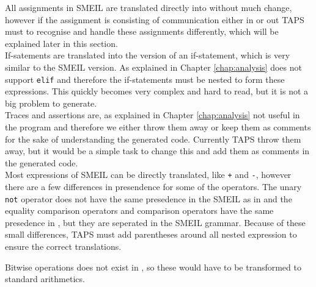 All assignments in SMEIL are translated directly into \cspm{} without much change, however if the assignment is consisting of communication either in or out TAPS must to recognise and handle these assignments differently, which will be explained later in this section.\\

If-satements are translated into the \cspm{} version of an if-statement, which is very similar to the SMEIL version. As explained in Chapter \ref{chap:analysis} \cspm{} does not support \texttt{elif} and therefore the \cspm{} if-statements must be nested to form these expressions. This quickly becomes very complex and hard to read, but it is not a big problem to generate.\\

Traces and assertions are, as explained in Chapter \ref{chap:analysis} not useful in the \cspm{} program and therefore we either throw them away or keep them as comments for the sake of understanding the generated code. Currently TAPS throw them away, but it would be a simple task to change this and add them as comments in the generated \cspm{} code.\\

Most expressions of SMEIL can be directly translated, like \texttt{+} and \texttt{-}, however there are a few differences in presendence for some of the operators. The unary \texttt{not} operator does not have the same presedence in the SMEIL as in \cspm{} and the equality comparison operators and comparison operators have the same presedence in \cspm{}, but they are seperated in the SMEIL grammar. Because of these small differences, TAPS must add parentheses around all nested expression to ensure the correct translations.

Bitwise operations does not exist in \cspm{}, so these would have to be transformed to standard arithmetics. %



